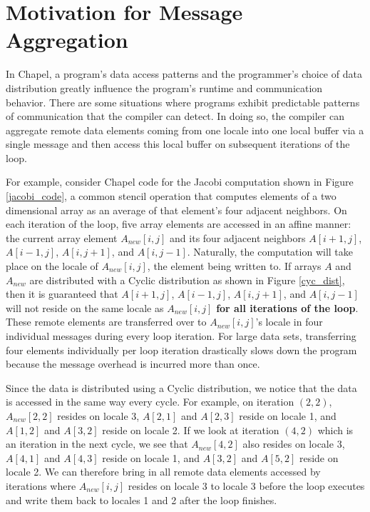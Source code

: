 \section{Motivation for Message Aggregation}\label{sec:motivation_for_aggregation} 

In Chapel, a program's data access patterns and the programmer's choice of data distribution greatly influence the program's runtime and communication behavior. There are some situations where programs exhibit predictable patterns of communication that the compiler can detect. In doing so, the compiler can aggregate remote data elements coming from one locale into one local buffer via a single message and then access this local buffer on subsequent iterations of the loop. 

For example, consider Chapel code for the Jacobi computation shown in Figure \ref{jacobi_code}, a common stencil operation that computes elements of a two dimensional array as an average of that element's four adjacent neighbors. On each iteration of the loop, five array elements are accessed in an affine manner: the current array element $A_{new}[i, j]$ and its four adjacent neighbors $A[i+1, j]$, $A[i-1, j]$, $A[i, j+1]$, and $A[i, j-1]$. Naturally, the computation will take place on the locale of $A_{new}[i, j]$, the element being written to. If arrays $A$ and $A_{new}$ are distributed with a Cyclic distribution as shown in Figure \ref{cyc_dist}, then it is guaranteed that $A[i+1, j]$, $A[i-1, j]$, $A[i, j+1]$, and $A[i, j-1]$ will not reside on the same locale as $A_{new}[i, j]$ \textbf{for all iterations of the loop}. These remote elements are transferred over to $A_{new}[i, j]$'s locale in four individual messages during every loop iteration. For large data sets, transferring four elements individually per loop iteration drastically slows down the program because the message overhead is incurred more than once. 

Since the data is distributed using a Cyclic distribution, we notice that the data is accessed in the same way every cycle. For example, on iteration $(2, 2)$, $A_{new}[2, 2]$ resides on locale 3, $A[2, 1]$ and $A[2, 3]$ reside on locale 1, and $A[1, 2]$ and $A[3, 2]$ reside on locale 2. If we look at iteration $(4, 2)$ which is an iteration in the next cycle, we see that $A_{new}[4, 2]$ also resides on locale 3, $A[4, 1]$ and $A[4, 3]$ reside on locale 1, and $A[3, 2]$ and $A[5, 2]$ reside on locale 2. We can therefore bring in all remote data elements accessed by iterations where $A_{new}[i, j]$ resides on locale 3 to locale 3 before the loop executes and write them back to locales 1 and 2 after the loop finishes. 

